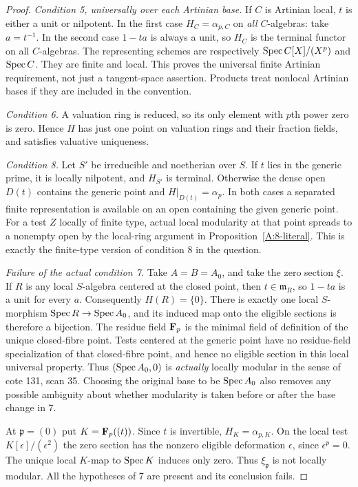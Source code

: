\begin{proof}
\emph{Condition 5, universally over each Artinian base.}
If $C$ is Artinian local, $t$ is either a unit or nilpotent.
In the first case $H_C=\alpha_{p,C}$ on \emph{all} $C$-algebras:
take $a=t^{-1}$. In the second case $1-ta$ is always a unit,
so $H_C$ is the terminal functor on all $C$-algebras. The
representing schemes are respectively
$\operatorname{Spec} C[X]/(X^p)$ and $\operatorname{Spec} C$. They are finite and local.
This proves the universal finite Artinian requirement, not just
a tangent-space assertion. Products treat nonlocal Artinian
bases if they are included in the convention.

\emph{Condition 6.}
A valuation ring is reduced, so its only element with $p$th
power zero is zero. Hence $H$ has just one point on valuation
rings and their fraction fields, and satisfies valuative
uniqueness.

\emph{Condition 8.}
Let $S'$ be irreducible and noetherian over $S$. If $t$ lies in
the generic prime, it is locally nilpotent, and $H_{S'}$ is
terminal. Otherwise the dense open $D(t)$ contains the generic
point and $H|_{D(t)}=\alpha_p$. In both cases a separated finite
representation is available on an open containing the given
generic point. For a test $Z$ locally of finite type, actual
local modularity at that point spreads to a nonempty open by
the local-ring argument in Proposition~\ref{A:8-literal}.
This is exactly the finite-type version of condition 8 in the
question.

\emph{Failure of the actual condition 7.}
Take $A=B=A_0$, and take the zero section $\xi$.
If $R$ is any local $S$-algebra centered at the closed point,
then $t\in\mathfrak m_R$, so $1-ta$ is a unit for every $a$.
Consequently $H(R)=\{0\}$. There is exactly one local
$S$-morphism $\operatorname{Spec} R\to\operatorname{Spec} A_0$, and its induced map onto
the eligible sections is therefore a bijection. The residue
field $\mathbf F_p$ is the minimal field of definition of the unique
closed-fibre point. Tests centered at the generic point have
no residue-field specialization of that closed-fibre point,
and hence no eligible section in this local universal property.
Thus $(\operatorname{Spec} A_0,0)$ is \emph{actually} locally modular in the
sense of cote 131, scan 35. Choosing the original base to be
$\operatorname{Spec} A_0$ also removes any possible ambiguity about whether
modularity is taken before or after the base change in 7.

At $\mathfrak p=(0)$ put $K=\mathbf F_p((t))$. Since $t$ is
invertible, $H_K=\alpha_{p,K}$. On the local test
$K[\epsilon]/(\epsilon^2)$ the zero section has the nonzero
eligible deformation $\epsilon$, since $\epsilon^p=0$.
The unique local $K$-map to $\operatorname{Spec} K$ induces only zero.
Thus $\xi_{\mathfrak p}$ is not locally modular. All the
hypotheses of 7 are present and its conclusion fails.
\end{proof}

